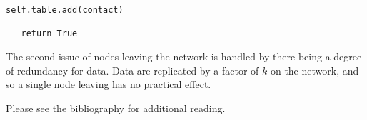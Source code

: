 \documentclass[12pt]{report}
\begin{document}
\begin{itemize}
\begin{lstlisting}[caption={Protocol.handle\_node()}, label=handle_node]
   self.table.add(contact)

   return True
\end{lstlisting}
    
    The second issue of nodes leaving the network is handled by there
    being a degree of redundancy for data.  Data are replicated by a factor of
    $k$ on the network, and so a single node leaving has no practical effect.

    \end{itemize}

    Please see the bibliography for additional reading.
	
    \pagebreak

\nocite{*}
\printbibliography
\end{document}
